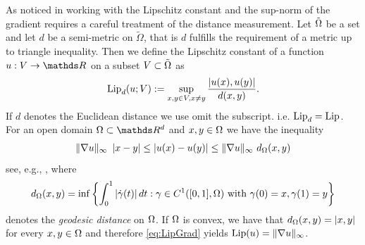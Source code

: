 As noticed in \cite{jensen1993uniqueness} working with the Lipschitz constant and the sup-norm of the gradient requires a careful 
treatment of the distance measurement. Let $\tilde{\Omega}$ be a set and let $d$ be a semi-metric on $\tilde\Omega$, that is $d$ fulfills 
the requirement of a metric up to triangle inequality. Then we define the Lipschitz constant of a function $u:V\to \R$ on a subset $V\subset \tilde{\Omega}$ as
%
\begin{align*}
\operatorname{Lip}_d(u; V):= \sup_{x,y\in V, x\neq y} \frac{\left|u(x), u(y)\right|}{d(x,y)}.
\end{align*}
%
If $d$ denotes the Euclidean distance we use omit the subscript. i.e. $\operatorname{Lip}_d = \operatorname{Lip}$.
For an open domain $\domain\subset\R^d$ and $x,y\in\Omega$ we have the inequality
%
\begin{align}\label{eq:LipGrad}
\|\nabla u\|_\infty\ \left|x-y\right| \leq \left|u(x) - u(y)\right| \leq \|\nabla u\|_\infty\ d_\Omega(x,y)
\end{align}
%
see, e.g., \cite[Prop9.3, Rem. 7]{brezis2011functional}, where
%
\begin{align*}
d_\Omega(x,y) = \inf \left\{
\int_0^1 \left|\dot{\gamma}(t)\right| dt : \gamma\in C^1([0,1], \Omega)\text{ with } \gamma(0)=x, \gamma(1) =y
\right\}
\end{align*}
%
denotes the \emph{geodesic distance} on $\Omega$. If $\Omega$ is convex, we have that $d_\Omega(x,y) = \left|x,y\right|$ for every 
$x,y\in \Omega$ and therefore \cref{eq:LipGrad} yields $\operatorname{Lip}(u) = \|\nabla u\|_\infty$. 

